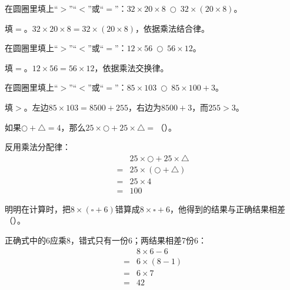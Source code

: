 在圆圈里填上“\(>\)”“\(<\)”或“\(=\)”：\(32\times20\times8\ \bigcirc\ 32\times(20\times8)\)。\par
\begin{BookAnswer}
填\(=\)。\(32\times20\times8=32\times(20\times8)\)，依据乘法结合律。
\end{BookAnswer}

在圆圈里填上“\(>\)”“\(<\)”或“\(=\)”：\(12\times56\ \bigcirc\ 56\times12\)。\par
\begin{BookAnswer}
填\(=\)。\(12\times56=56\times12\)，依据乘法交换律。
\end{BookAnswer}

在圆圈里填上“\(>\)”“\(<\)”或“\(=\)”：\(85\times103\ \bigcirc\ 85\times100+3\)。\par
\begin{BookAnswer}
填\(>\)。左边\(85\times103=8500+255\)，右边为\(8500+3\)，而\(255>3\)。
\end{BookAnswer}

如果\(\bigcirc+\triangle=4\)，那么\(25\times\bigcirc+25\times\triangle=\)（\hspace{1.8em}）。\par
\begin{BookAnswer}
反用乘法分配律：\[\begin{aligned} &25\times\bigcirc+25\times\triangle\\={}&25\times(\bigcirc+\triangle)\\={}&25\times4\\={}&100\end{aligned}\]
\end{BookAnswer}

明明在计算时，把\(8\times(\square+6)\)错算成\(8\times\square+6\)，他得到的结果与正确结果相差（\hspace{1.8em}）。\par
\begin{BookAnswer}
正确式中的6应乘8，错式只有一份6；两结果相差7份6：\[\begin{aligned}&8\times6-6\\={}&6\times(8-1)\\={}&6\times7\\={}&42\end{aligned}\]
\end{BookAnswer}


